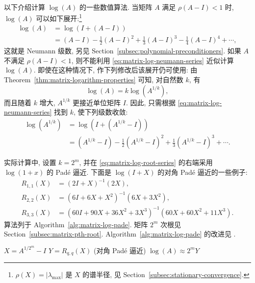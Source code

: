 {以下介绍计算 $\log(A)$ 的一些数值算法. 当矩阵 $A$ 满足 $\rho(A-I)<1$ 时, $\log(A)$ 可以如下展开:}\footnote{{$\rho(X)=|\lambda_{\max}|$ 是 $X$ 的谱半径, 见 Section~\ref{subsec:stationary-convergence}.}}
\begin{equation}\label{eq:matrix-log-neumann-series}\begin{aligned}\log(A)&=\log(I+(A-I))\\&=(A-I)-\frac{1}{2}(A-I)^2+\frac{1}{3}(A-I)^3-\frac{1}{4}(A-I)^4+\cdots,\end{aligned}\end{equation}
{这就是 Neumann 级数, 另见 Section~\ref{subsec:polynomial-preconditioners}. 如果 $A$ 不满足 $\rho(A-I)<1$, 则不能利用 \eqref{eq:matrix-log-neumann-series} 近似计算 $\log(A)$. 即使在这种情况下, 作下列修改后该展开仍可使用: 由 Theorem~\ref{thm:matrix-logarithm-properties} 可知, 对自然数 $k$, 有}
\[\log(A)=k\log(A^{1/k}),\]
{而且随着 $k$ 增大, $A^{1/k}$ 更接近单位矩阵 $I$. 因此, 只需根据 \eqref{eq:matrix-log-neumann-series} 找到 $k$, 使下列级数收敛:}
\begin{equation}\label{eq:matrix-log-root-series}\begin{aligned}\log(A^{1/k})&=\log(I+(A^{1/k}-I))\\&=(A^{1/k}-I)-\frac{1}{2}(A^{1/k}-I)^2+\frac{1}{3}(A^{1/k}-I)^3+\cdots.\end{aligned}\end{equation}

{实际计算中, 设置 $k=2^m$, 并在 \eqref{eq:matrix-log-root-series} 的右端采用 $\log(1+x)$ 的 Padé 逼近. 下面是 $\log(I+X)$ 的对角 Padé 逼近的一些例子:}
\[\begin{aligned}R_{1,1}(X)&=(2I+X)^{-1}(2X),\\R_{2,2}(X)&=(6I+6X+X^2)^{-1}(6X+3X^2),\\R_{3,3}(X)&=(60I+90X+36X^2+3X^3)^{-1}(60X+60X^2+11X^3).\end{aligned}\]
{算法列于 Algorithm~\ref{alg:matrix-log-pade}. 矩阵 $2^m$ 次根见 Section~\ref{subsec:matrix-pth-root}. Algorithm~\ref{alg:matrix-log-pade} 的改进见 .}

\begin{algorithm}[H]\caption{{计算 $\log(A)$}}\label{alg:matrix-log-pade}\begin{algorithmic}[1]
\State $X=A^{1/2^m}-I$
\State $Y=R_{q,q}(X)$ ({对角 Padé 逼近})
\State $\log(A)\approx2^mY$
\end{algorithmic}\end{algorithm}

